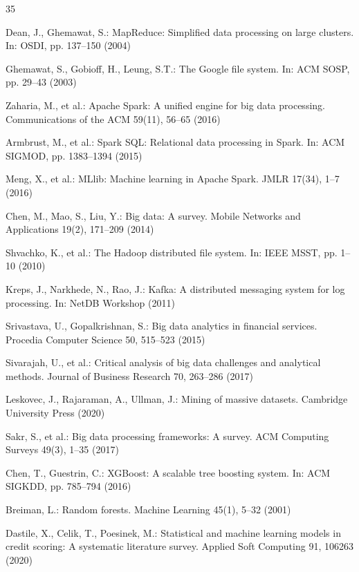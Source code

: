 \documentclass[runningheads]{llncs}
\begin{document}
\begin{thebibliography}{35}

Dean, J., Ghemawat, S.: MapReduce: Simplified data processing on large clusters. In: OSDI, pp. 137--150 (2004)

Ghemawat, S., Gobioff, H., Leung, S.T.: The Google file system. In: ACM SOSP, pp. 29--43 (2003)

Zaharia, M., et al.: Apache Spark: A unified engine for big data processing. Communications of the ACM 59(11), 56--65 (2016)

Armbrust, M., et al.: Spark SQL: Relational data processing in Spark. In: ACM SIGMOD, pp. 1383--1394 (2015)

Meng, X., et al.: MLlib: Machine learning in Apache Spark. JMLR 17(34), 1--7 (2016)

Chen, M., Mao, S., Liu, Y.: Big data: A survey. Mobile Networks and Applications 19(2), 171--209 (2014)

Shvachko, K., et al.: The Hadoop distributed file system. In: IEEE MSST, pp. 1--10 (2010)

Kreps, J., Narkhede, N., Rao, J.: Kafka: A distributed messaging system for log processing. In: NetDB Workshop (2011)

Srivastava, U., Gopalkrishnan, S.: Big data analytics in financial services. Procedia Computer Science 50, 515--523 (2015)

Sivarajah, U., et al.: Critical analysis of big data challenges and analytical methods. Journal of Business Research 70, 263--286 (2017)

Leskovec, J., Rajaraman, A., Ullman, J.: Mining of massive datasets. Cambridge University Press (2020)

Sakr, S., et al.: Big data processing frameworks: A survey. ACM Computing Surveys 49(3), 1--35 (2017)

Chen, T., Guestrin, C.: XGBoost: A scalable tree boosting system. In: ACM SIGKDD, pp. 785--794 (2016)

Breiman, L.: Random forests. Machine Learning 45(1), 5--32 (2001)

Dastile, X., Celik, T., Poesinek, M.: Statistical and machine learning models in credit scoring: A systematic literature survey. Applied Soft Computing 91, 106263 (2020)


\end{thebibliography}
\end{document}
